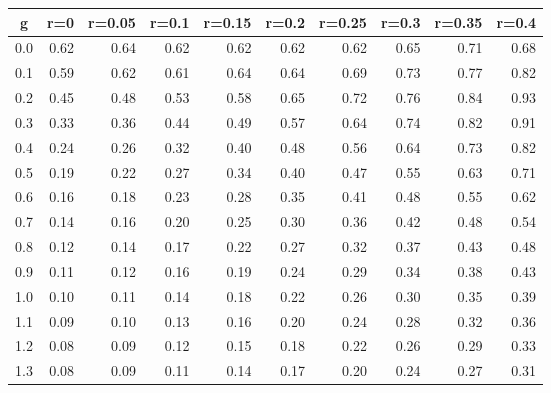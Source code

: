 %
\begin{table}[!tbp]
 \begin{center}
 \begin{tabular}{rrrrrrrrrr}\hline\hline
\multicolumn{1}{c}{g}&\multicolumn{1}{c}{r=0}&\multicolumn{1}{c}{r=0.05}&\multicolumn{1}{c}{r=0.1}&\multicolumn{1}{c}{r=0.15}&\multicolumn{1}{c}{r=0.2}&\multicolumn{1}{c}{r=0.25}&\multicolumn{1}{c}{r=0.3}&\multicolumn{1}{c}{r=0.35}&\multicolumn{1}{c}{r=0.4}\tabularnewline
\hline
0.0&0.62&0.64&0.62&0.62&0.62&0.62&0.65&0.71&0.68\tabularnewline
0.1&0.59&0.62&0.61&0.64&0.64&0.69&0.73&0.77&0.82\tabularnewline
0.2&0.45&0.48&0.53&0.58&0.65&0.72&0.76&0.84&0.93\tabularnewline
0.3&0.33&0.36&0.44&0.49&0.57&0.64&0.74&0.82&0.91\tabularnewline
0.4&0.24&0.26&0.32&0.40&0.48&0.56&0.64&0.73&0.82\tabularnewline
0.5&0.19&0.22&0.27&0.34&0.40&0.47&0.55&0.63&0.71\tabularnewline
0.6&0.16&0.18&0.23&0.28&0.35&0.41&0.48&0.55&0.62\tabularnewline
0.7&0.14&0.16&0.20&0.25&0.30&0.36&0.42&0.48&0.54\tabularnewline
0.8&0.12&0.14&0.17&0.22&0.27&0.32&0.37&0.43&0.48\tabularnewline
0.9&0.11&0.12&0.16&0.19&0.24&0.29&0.34&0.38&0.43\tabularnewline
1.0&0.10&0.11&0.14&0.18&0.22&0.26&0.30&0.35&0.39\tabularnewline
1.1&0.09&0.10&0.13&0.16&0.20&0.24&0.28&0.32&0.36\tabularnewline
1.2&0.08&0.09&0.12&0.15&0.18&0.22&0.26&0.29&0.33\tabularnewline
1.3&0.08&0.09&0.11&0.14&0.17&0.20&0.24&0.27&0.31\tabularnewline
\hline
\end{tabular}

\end{center}

\end{table}

